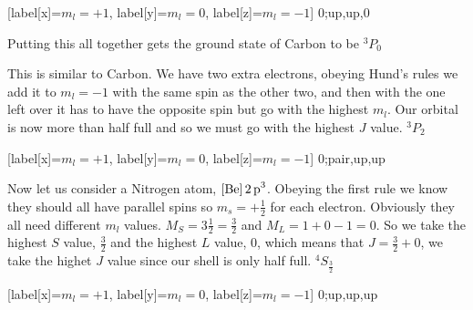 \documentclass{article}
\begin{document}
    \begin{center}
        \begin{modiagram}[style=square, AO-width=20pt]
             [label[x]={$m_l=+1$}, label[y]={$m_l=0$}, label[z]={$m_l=-1$}] {0;up,up,0}
        \end{modiagram}
    \end{center}

    Putting this all together gets the ground state of Carbon to be $^3P_0$
    \newline

    This is similar to Carbon. We have two extra electrons, obeying Hund's rules we add it to $m_l = -1$
    with the same spin as the other two, and then with the one left over it has to have the opposite spin but
    go with the highest $m_l$. Our orbital is now more than half full and so we must go with the highest $J$ value.
    $^3P_2$
    \begin{center}
        \begin{modiagram}[style=square, AO-width=20pt]
             [label[x]={$m_l=+1$}, label[y]={$m_l=0$}, label[z]={$m_l=-1$}] {0;pair,up,up}
        \end{modiagram}
    \end{center}

    Now let us consider a Nitrogen atom, $\ce{[Be] 2p^3}$. Obeying the first rule we know they should all have 
    parallel spins so $m_s = +\frac{1}{2}$ for each electron. Obviously they all need different $m_l$ values.
    $M_S = 3\frac{1}{2} = \frac{3}{2}$ and $M_L = 1 + 0 - 1 = 0$. So we take the highest $S$ value, $\frac{3}{2}$
    and the highest $L$ value, $0$, which means that $J = \frac{3}{2} + 0$, we take the highet $J$ value since
    our shell is only half full. $^4S_\frac{3}{2}$
    \begin{center}
        \begin{modiagram}[style=square, AO-width=20pt]
             [label[x]={$m_l=+1$}, label[y]={$m_l=0$}, label[z]={$m_l=-1$}] {0;up,up,up}
        \end{modiagram}
    \end{center}
    \newpage
\end{document}
